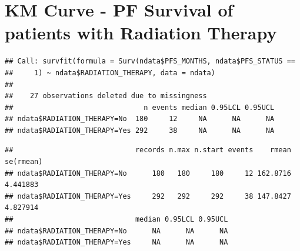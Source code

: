 \documentclass[
  11pt,
]{article}
\newenvironment{Shaded}{\begin{snugshade}}{\end{snugshade}}
\newcommand{\AttributeTok}[1]{\textcolor[rgb]{0.77,0.63,0.00}{#1}}
\newcommand{\DecValTok}[1]{\textcolor[rgb]{0.00,0.00,0.81}{#1}}
\newcommand{\FunctionTok}[1]{\textcolor[rgb]{0.00,0.00,0.00}{#1}}
\newcommand{\NormalTok}[1]{#1}
\newcommand{\OtherTok}[1]{\textcolor[rgb]{0.56,0.35,0.01}{#1}}
\newcommand{\SpecialCharTok}[1]{\textcolor[rgb]{0.00,0.00,0.00}{#1}}
\newcommand{\StringTok}[1]{\textcolor[rgb]{0.31,0.60,0.02}{#1}}
\begin{document}
\begin{Shaded}
\end{Shaded}

\newpage
\section{KM Curve - PF Survival of patients with Radiation Therapy}

\begin{Shaded}
\end{Shaded}

\begin{verbatim}
## Call: survfit(formula = Surv(ndata$PFS_MONTHS, ndata$PFS_STATUS == 
##     1) ~ ndata$RADIATION_THERAPY, data = ndata)
## 
##    27 observations deleted due to missingness 
##                               n events median 0.95LCL 0.95UCL
## ndata$RADIATION_THERAPY=No  180     12     NA      NA      NA
## ndata$RADIATION_THERAPY=Yes 292     38     NA      NA      NA
\end{verbatim}

\begin{Shaded}
\end{Shaded}

\begin{verbatim}
##                             records n.max n.start events    rmean se(rmean)
## ndata$RADIATION_THERAPY=No      180   180     180     12 162.8716  4.441883
## ndata$RADIATION_THERAPY=Yes     292   292     292     38 147.8427  4.827914
##                             median 0.95LCL 0.95UCL
## ndata$RADIATION_THERAPY=No      NA      NA      NA
## ndata$RADIATION_THERAPY=Yes     NA      NA      NA
\end{verbatim}
\end{document}
